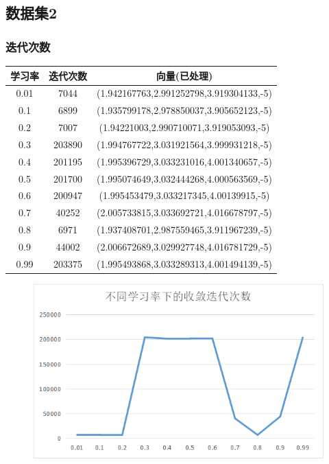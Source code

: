 \documentclass[10pt,a4paper]{ctexart}
\begin{document}
\subsection{数据集2}
\subsubsection*{迭代次数}
\begin{longtable}{|c|c|c|}
	\hline 学习率&迭代次数&向量(已处理)\\
	\hline 0.01&7044&(1.942167763,2.991252798,3.919304133,-5)\\
\hline 0.1	&6899&(1.935799178,2.978850037,3.905652123,-5)\\	
\hline 0.2	&7007&(1.94221003,2.990710071,3.919053093,-5)\\
\hline 0.3	&203890&(1.994767722,3.031921564,3.999931218,-5)\\	
\hline 0.4	&201195&(1.995396729,3.033231016,4.001340657,-5)\\	
\hline 0.5	&201700&(1.995074649,3.032444268,4.000563569,-5)\\	
\hline 0.6	&200947&(1.995453479,3.033217345,4.00139915,-5)\\	
\hline 0.7	&40252&(2.005733815,3.033692721,4.016678797,-5)\\	
\hline 0.8	&6971&(1.937408701,2.987559465,3.911967239,-5)\\	
\hline 0.9	&44002&(2.006672689,3.029927748,4.016781729,-5)\\	
\hline 0.99&203375&(1.995493868,3.033289313,4.001494139,-5)\\
	\hline 
	\end{longtable}
\begin{figure}[htbp]
  \centering
  \includegraphics[width=1\textwidth]{迭代次数2.png}
\end{figure}
\end{document}

